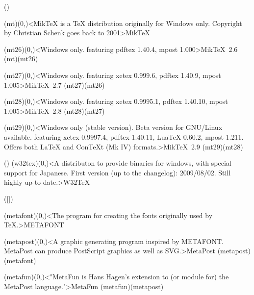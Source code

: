 \documentclass[
%
]{scrartcl}
\begin{document}
\tograph(){
	\tonode(mt)(0,\layer)<MikTeX is a TeX distribution originally for Windows only. Copyright by Christian Schenk goes back to 2001>{Mik\TeX}
	\steplayer

	\tonode(mt26)(0,\layer)<Windows only. featuring  pdftex 1.40.4, mpost 1.000>{Mik\TeX\ 2.6}
	\todraw(mt)(mt26)
	\steplayer

	\tonode(mt27)(0,\layer)<Windows only. featuring  xetex 0.999.6, pdftex 1.40.9, mpost 1.005>{Mik\TeX\ 2.7}
	\todraw(mt27)(mt26)
	\steplayer

	\tonode(mt28)(0,\layer)<Windows only. featuring  xetex 0.9995.1, pdftex 1.40.10, mpost 1.005>{Mik\TeX\ 2.8}
	\todraw(mt28)(mt27)
	\steplayer

	\tonode(mt29)(0,\layer)<Windows only (stable version). Beta version for GNU/Linux available. featuring xetex 0.9997.4, pdftex 1.40.11, LuaTeX 0.60.2, mpost 1.211. Offers both LaTeX and ConTeXt (Mk IV) formats.>{Mik\TeX\ 2.9}
	\todraw(mt29)(mt28)
}

\tograph(){
	\tonode(w32tex)(0,\layer)<A distributon to provide binaries for windows, with special support for Japanese. First version (up to the changelog): 2009/08/02. Still highly up-to-date.>{W32\TeX}
}

\newpage
\tograph([\program]){
	\tonode(metafont)(0,\layer)<The program for creating the fonts originally used by TeX.>{METAFONT}
	\steplayer

	\tonode(metapost)(0,\layer)<A graphic generating program inspired by METAFONT. MetaPost can produce PostScript graphics as well as SVG.>{MetaPost}
	\todraw(metapost)(metafont)
	\steplayer

	\tonode(metafun)(0,\layer)<"MetaFun is Hans Hagen's extension to (or module for) the MetaPost language.">{MetaFun}
	\todraw(metafun)(metapost)
}
\end{document}
